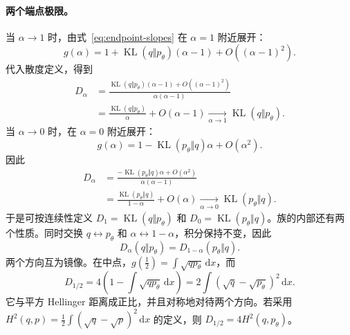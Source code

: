 \documentclass[UTF8,fontset=none,11pt,a4paper]{ctexart}
\newcommand{\KL}{\operatorname{KL}}
\newcommand{\dd}{\,\mathrm d}
\begin{document}
\paragraph{两个端点极限。}
当 $\alpha\to1$ 时，由式~\eqref{eq:endpoint-slopes} 在 $\alpha=1$ 附近展开：
\[
g(\alpha)
=1+\KL(q\Vert p_\theta)(\alpha-1)
+O((\alpha-1)^2).
\]
代入散度定义，得到
\begin{equation}
\begin{aligned}
D_\alpha
&=\frac{\KL(q\Vert p_\theta)(\alpha-1)+O((\alpha-1)^2)}{\alpha(\alpha-1)}\\
&=\frac{\KL(q\Vert p_\theta)}{\alpha}+O(\alpha-1)
\xrightarrow[\alpha\to1]{}\KL(q\Vert p_\theta).
\end{aligned}
\label{eq:limit-one}
\end{equation}
当 $\alpha\to0$ 时，在 $\alpha=0$ 附近展开：
\[
g(\alpha)=1-\KL(p_\theta\Vert q)\alpha+O(\alpha^2).
\]
因此
\begin{equation}
\begin{aligned}
D_\alpha
&=\frac{-\KL(p_\theta\Vert q)\alpha+O(\alpha^2)}{\alpha(\alpha-1)}\\
&=\frac{\KL(p_\theta\Vert q)}{1-\alpha}+O(\alpha)
\xrightarrow[\alpha\to0]{}\KL(p_\theta\Vert q).
\end{aligned}
\label{eq:limit-zero}
\end{equation}
于是可按连续性定义 $D_1=\KL(q\Vert p_\theta)$ 和 $D_0=\KL(p_\theta\Vert q)$。族的内部还有两个性质。同时交换 $q\leftrightarrow p_\theta$ 和 $\alpha\leftrightarrow1-\alpha$，积分保持不变，因此
\[
D_\alpha(q\Vert p_\theta)=D_{1-\alpha}(p_\theta\Vert q).
\]
两个方向互为镜像。在中点，$g(\tfrac12)=\int\sqrt{qp_\theta}\dd x$，而
\[
D_{1/2}
=4\left(1-\int\sqrt{qp_\theta}\dd x\right)
=2\int(\sqrt q-\sqrt{p_\theta})^2\dd x.
\]
它与平方 Hellinger 距离成正比，并且对称地对待两个方向。若采用 $H^2(q,p)=\tfrac12\int(\sqrt q-\sqrt p)^2\dd x$ 的定义，则 $D_{1/2}=4H^2(q,p_\theta)$\cite{nielsen2022}。
\end{document}
